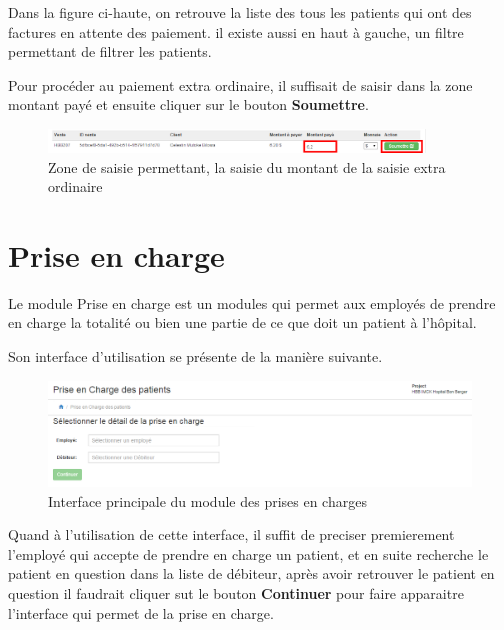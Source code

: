 \documentclass[12pt,a4paper]{report}
\begin{document}
Dans la figure ci-haute, on retrouve la liste des tous les patients qui ont des factures en attente des paiement. il existe aussi en haut à gauche, un filtre permettant de filtrer les patients.

Pour procéder au paiement extra ordinaire, il suffisait de saisir dans la zone montant payé et ensuite cliquer sur le bouton \textbf{Soumettre}. 

\begin{figure}[h]
\begin{center}
\includegraphics[width=10cm]{pic/MontantSoumettre.png}
\end{center}
\caption{Zone de saisie permettant, la saisie du montant de la saisie extra ordinaire}
\label{Zone de saisie permettant, la saisie du montant de la saisie extra ordinaire}
\end{figure}


\newpage
\section{ Prise en charge}
Le module  Prise en charge est un modules qui permet aux employés de prendre en charge la totalité ou bien une partie de ce que doit un patient à l'hôpital. 

Son interface d'utilisation se présente de la manière suivante.

\begin{figure}[h]
\begin{center}
\includegraphics[width=14cm]{pic/InterPrinPrisCharge.png}
\end{center}
\caption{Interface principale du module des prises en charges}
\label{Interface principale du module des prises en charges}
\end{figure}

Quand à l'utilisation de cette interface, il suffit de preciser premierement l'employé qui accepte de prendre en charge un patient, et en suite recherche le patient en question dans la liste de débiteur, après avoir retrouver le patient en question il faudrait cliquer sut le bouton  \textbf{Continuer} pour faire apparaitre l'interface qui permet de la prise en charge.
\end{document}
